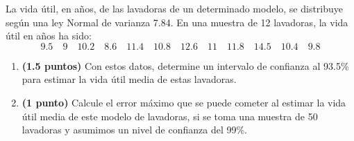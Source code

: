 
La vida útil, en años, de las lavadoras de un determinado modelo, se
distribuye según una ley Normal de varianza 7.84. En una muestra de 12
lavadoras, la vida útil en años ha sido:
\[
9.5\quad 9\quad 10.2\quad 8.6\quad 11.4\quad 10.8\quad 12.6\quad
11\quad 11.8\quad 14.5\quad 10.4\quad 9.8
\]
\begin{enumerate}[label=\alph*)]
  \item \textbf{(1.5 puntos)} Con estos datos, determine un intervalo de
  confianza al 93.5\% para estimar la vida útil media de estas lavadoras.
  \item \textbf{(1 punto)} Calcule el error máximo que se puede cometer al
  estimar la vida útil media de este modelo de lavadoras, si se toma una
  muestra de 50 lavadoras y asumimos un nivel de confianza del 99\%.
\end{enumerate}
